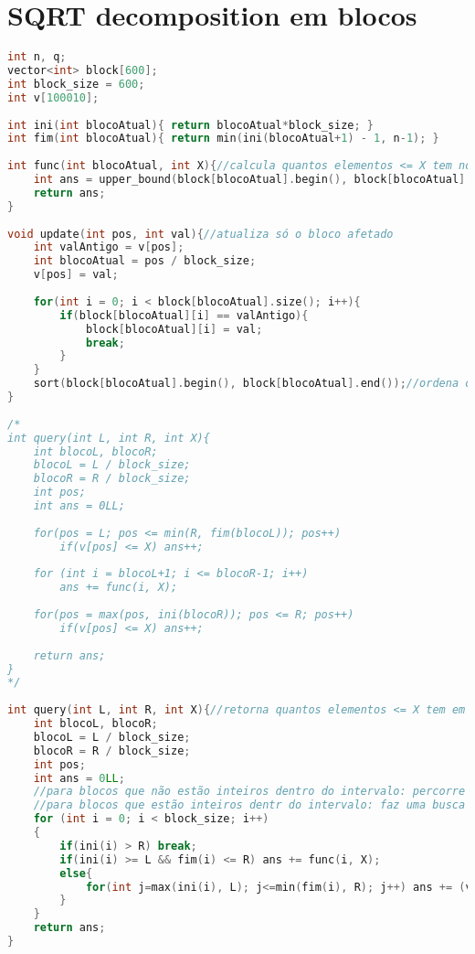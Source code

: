 \documentclass[12pt,a4paper,twoside]{report}
\begin{document}
\section{SQRT decomposition em blocos}
\noindent\begin{lstlisting}[caption=SQRT decomposition em blocos,language=C++]
int n, q;
vector<int> block[600];
int block_size = 600;
int v[100010];
  
int ini(int blocoAtual){ return blocoAtual*block_size; }
int fim(int blocoAtual){ return min(ini(blocoAtual+1) - 1, n-1); }
  
int func(int blocoAtual, int X){//calcula quantos elementos <= X tem no blocoAtual
    int ans = upper_bound(block[blocoAtual].begin(), block[blocoAtual].end(), X) - block[blocoAtual].begin();
    return ans;
}
  
void update(int pos, int val){//atualiza só o bloco afetado
    int valAntigo = v[pos];
    int blocoAtual = pos / block_size;
    v[pos] = val;
     
    for(int i = 0; i < block[blocoAtual].size(); i++){
        if(block[blocoAtual][i] == valAntigo){
            block[blocoAtual][i] = val;
            break;
        }
    }
    sort(block[blocoAtual].begin(), block[blocoAtual].end());//ordena o bloco de novo
}
 
/*
int query(int L, int R, int X){
    int blocoL, blocoR;
    blocoL = L / block_size;
    blocoR = R / block_size;
    int pos;
    int ans = 0LL;
     
    for(pos = L; pos <= min(R, fim(blocoL)); pos++)
        if(v[pos] <= X) ans++;
     
    for (int i = blocoL+1; i <= blocoR-1; i++)
        ans += func(i, X);
     
    for(pos = max(pos, ini(blocoR)); pos <= R; pos++)
        if(v[pos] <= X) ans++;
     
    return ans;
}
*/
 
int query(int L, int R, int X){//retorna quantos elementos <= X tem em [L, R]
    int blocoL, blocoR;
    blocoL = L / block_size;
    blocoR = R / block_size;
    int pos;
    int ans = 0LL;
    //para blocos que não estão inteiros dentro do intervalo: percorre em O(n)
    //para blocos que estão inteiros dentr do intervalo: faz uma busca binária pra saber quantos elementos <= X existe
    for (int i = 0; i < block_size; i++)
    {
        if(ini(i) > R) break;
        if(ini(i) >= L && fim(i) <= R) ans += func(i, X);
        else{
            for(int j=max(ini(i), L); j<=min(fim(i), R); j++) ans += (v[j] <= X);
        }
    }
    return ans;
}
  

\end{lstlisting}
\end{document}

